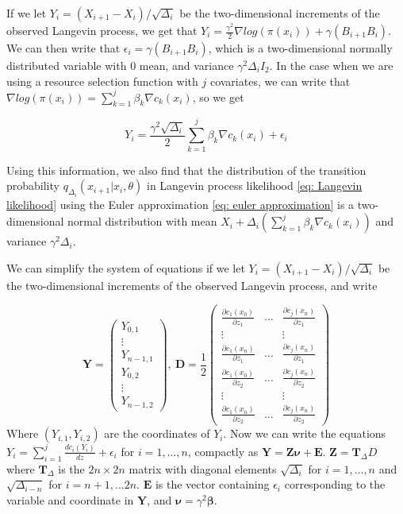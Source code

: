 If we let $Y_i = (X_{i+1} - X_i)/\sqrt{\Delta_i}$ be the two-dimensional increments of the observed Langevin process, we get that $Y_i = \frac{\gamma^2}{2}\nabla log(\pi(x_i)) + \gamma (B_{i+1} B_i)$. We can then write that $\epsilon_i = \gamma (B_{i+1} B_i)$, which is a two-dimensional normally distributed variable with $0$ mean, and variance $\gamma^2 \Delta_i I_2$. In the case when we are using a resource selection function with $j$ covariates, we can write that $\nabla log(\pi(x_i)) = \sum_{k = 1}^j \beta_k \nabla c_k(x_i)$, so we get

$$
    Y_i = \frac{\gamma^2 \sqrt{\Delta_i}}{2}\sum_{k = 1}^j \beta_k \nabla c_k(x_i) + \epsilon_i
$$

Using this information, we also find that the distribution of the transition probability $q_{\Delta_i}(x_{i+1}|x_i, \theta)$ in Langevin process likelihood \eqref{eq: Langevin likelihood} using the Euler approximation \eqref{eq: euler approximation} is a two-dimensional normal distribution with mean $X_i + \Delta_i(\sum_{k = 1}^j \beta_k \nabla c_k(x_i))$ and variance $\gamma^2\Delta_i$. 


We can simplify the system of equations if we let $Y_i = (X_{i+1} - X_i)/\sqrt{\Delta_i}$ be the two-dimensional increments of the observed Langevin process, and write 

$$
    \mathbf{Y} = \begin{pmatrix}
        Y_{0,1} \\
        \vdots \\
        Y_{n-1,1}\\
        Y_{0,2}\\
        \vdots\\
        Y_{n-1,2}
    \end{pmatrix} , \    
    \mathbf{D} = \frac{1}{2} 
    \begin{pmatrix}
        \frac{\partial c_1(x_0)}{\partial z_1} & \dots & \frac{\partial c_j(x_n)}{\partial z_1} \\
        \vdots & & \vdots \\
        \frac{\partial c_1(x_n)}{\partial z_1} & \dots & \frac{\partial c_j(x_n)}{\partial z_1} \\
        \frac{\partial c_1(x_0)}{\partial z_2} & \dots & \frac{\partial c_j(x_n)}{\partial z_2} \\
        \vdots & & \vdots \\
        \frac{\partial c_1(x_n)}{\partial z_2} & \dots & \frac{\partial c_j(x_n)}{\partial z_2}
    \end{pmatrix}
$$
Where $(Y_{i,1}, Y_{i,2})$ are the coordinates of $Y_i$. Now we can write the equations $Y_i = \sum_{i=1}^j \frac{dc_i(Y_i)}{dz} + \epsilon_i$ for $i=1,\dots , n$, compactly as $\mathbf{Y} = \mathbf{Z} \pmb{\nu} + \mathbf{E}$.
$\mathbf{Z} = \mathbf{T}_\Delta D$ where $\mathbf{T}_\Delta$ is the $2n\times 2n$ matrix with diagonal elements $\sqrt{\Delta_i}$ for $i=1, \dots, n$ and $\sqrt{\Delta_{i-n}}$ for $i=n+1,\dots 2n$. $\mathbf{E}$ is the vector containing $\epsilon_i$ corresponding to the variable and coordinate in $\mathbf{Y}$, and $\pmb{\nu} = \gamma^2 \pmb{\beta}$.

